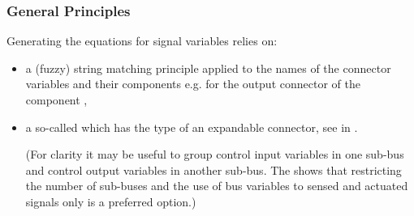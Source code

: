 \documentclass[letterpaper,10pt, openany,english]{sphinxmanual}
\begin{document}
\subsubsection{General Principles}
\label{\detokenize{requirements:general-principles}}
Generating the  equations for signal variables relies on:
\begin{itemize}
\item {} 
a (fuzzy) string matching principle applied to the names of the connector variables and their components e.g.  for the output connector  of the component ,

\item {} 
a so-called  which has the type of an expandable connector, see  in .

(For clarity it may be useful to group control input variables in one sub-bus and control output variables in another sub-bus. The  shows that restricting the number of sub-buses and the use of bus variables to sensed and actuated signals only is a preferred option.)

\end{itemize}
\end{document}
